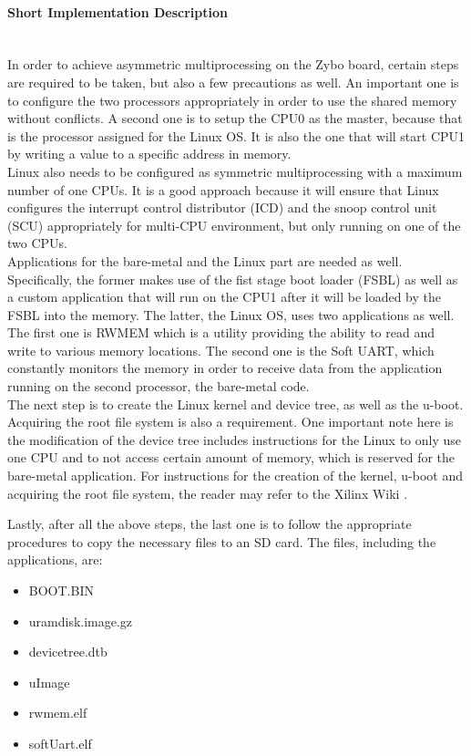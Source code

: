 \paragraph{Short Implementation Description}~\\
In order to achieve asymmetric multiprocessing on the Zybo board, certain steps are required to be taken, but also a few precautions as well.
An important one is to configure the two processors appropriately in order to use the shared memory without conflicts.
A second one is to setup the CPU0 as the master, because that is the processor assigned for the Linux OS.
It is also the one that will start CPU1 by writing a value to a specific address in memory.
\\
Linux also needs to be configured as symmetric multiprocessing with a maximum number of one CPUs.
It is a good approach because it will ensure that Linux configures the interrupt control distributor (ICD) and the snoop control unit (SCU) appropriately for multi-CPU environment, but only running on one of the two CPUs.
\\
Applications for the bare-metal and the Linux part are needed as well. Specifically, the former makes use of the fist stage boot loader (FSBL) as well as a custom application that will run on the CPU1 after it will be loaded by the FSBL into the memory.
The latter, the Linux OS, uses two applications as well.
The first one is RWMEM which is a utility providing the ability to read and write to various memory locations.
The second one is the Soft UART, which constantly monitors the memory in order to receive data from the application running on the second processor, the bare-metal code.
\\
The next step is to create the Linux kernel and device tree, as well as the u-boot.
Acquiring the root file system is also a requirement.
One important note here is the modification of the device tree includes instructions for the Linux to only use one CPU and to not access certain amount of memory, which is reserved for the bare-metal application.
For instructions for the creation of the kernel, u-boot and acquiring the root file system, the reader may refer to the Xilinx Wiki \cite{Xilinx_wiki}.\\

Lastly, after all the above steps, the last one is to follow the appropriate procedures to copy the necessary files to an SD card. The files, including the applications, are:
\begin{itemize}
\item BOOT.BIN
\item uramdisk.image.gz
\item devicetree.dtb
\item uImage
\item rwmem.elf
\item softUart.elf
\end{itemize}

